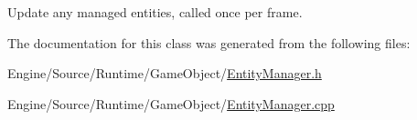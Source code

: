 Update any managed entities, called once per frame. 

The documentation for this class was generated from the following files\+:\begin{DoxyCompactItemize}
\item 
Engine/\+Source/\+Runtime/\+Game\+Object/\mbox{\hyperlink{_entity_manager_8h}{Entity\+Manager.\+h}}\item 
Engine/\+Source/\+Runtime/\+Game\+Object/\mbox{\hyperlink{_entity_manager_8cpp}{Entity\+Manager.\+cpp}}\end{DoxyCompactItemize}
